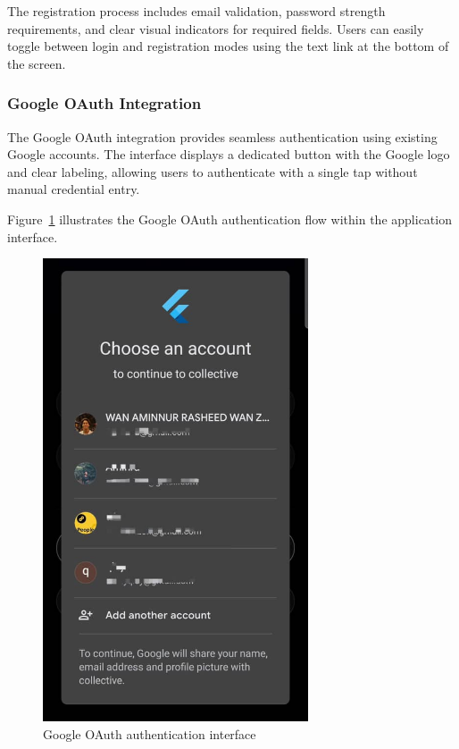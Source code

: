 The registration process includes email validation, password strength requirements, and clear visual indicators for required fields. Users can easily toggle between login and registration modes using the text link at the bottom of the screen.

\subsubsection{Google OAuth Integration}

The Google OAuth integration provides seamless authentication using existing Google accounts. The interface displays a dedicated button with the Google logo and clear labeling, allowing users to authenticate with a single tap without manual credential entry.

Figure~\ref{fig:google-oauth} illustrates the Google OAuth authentication flow within the application interface.

 \begin{figure}[H]
 \centering
 \includegraphics[width=0.7\textwidth]{files/imgs/prototype/google_oauth.jpeg}
 \caption{Google OAuth authentication interface}
 \label{fig:google-oauth}
 \end{figure}

